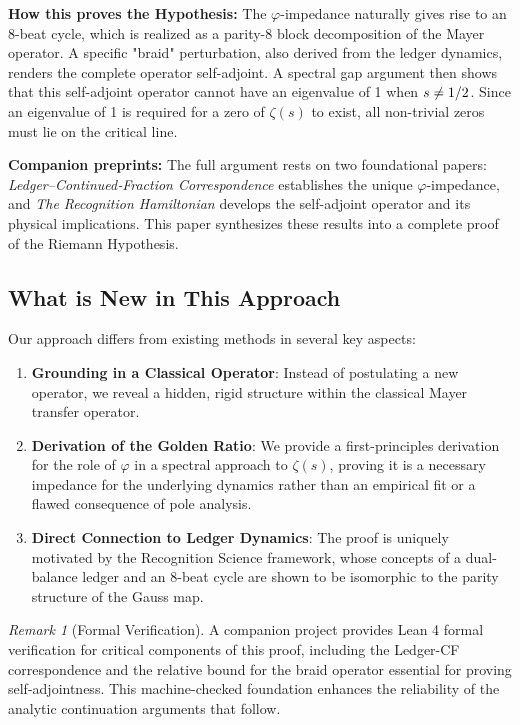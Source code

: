 \documentclass[11pt,a4paper]{article}
\theoremstyle{definition}
\theoremstyle{remark}
\newtheorem{remark}[theorem]{Remark}
\let\Re\relax
\DeclareMathOperator{\Re}{Re}
\begin{document}
\textbf{How this proves the Hypothesis:} The $\varphi$-impedance naturally gives rise to an 8-beat cycle, which is realized as a parity-8 block decomposition of the Mayer operator. A specific "braid" perturbation, also derived from the ledger dynamics, renders the complete operator self-adjoint. A spectral gap argument then shows that this self-adjoint operator cannot have an eigenvalue of 1 when $\Re s \neq 1/2$. Since an eigenvalue of 1 is required for a zero of $\zeta(s)$ to exist, all non-trivial zeros must lie on the critical line.

\textbf{Companion preprints:} The full argument rests on two foundational papers: \emph{Ledger–Continued‑Fraction Correspondence} establishes the unique $\varphi$-impedance, and \emph{The Recognition Hamiltonian} develops the self-adjoint operator and its physical implications. This paper synthesizes these results into a complete proof of the Riemann Hypothesis.

\subsection{What is New in This Approach}

Our approach differs from existing methods in several key aspects:

\begin{enumerate}
\item \textbf{Grounding in a Classical Operator}: Instead of postulating a new operator, we reveal a hidden, rigid structure within the classical Mayer transfer operator.

\item \textbf{Derivation of the Golden Ratio}: We provide a first-principles derivation for the role of $\varphi$ in a spectral approach to $\zeta(s)$, proving it is a necessary impedance for the underlying dynamics rather than an empirical fit or a flawed consequence of pole analysis.

\item \textbf{Direct Connection to Ledger Dynamics}: The proof is uniquely motivated by the Recognition Science framework, whose concepts of a dual-balance ledger and an 8-beat cycle are shown to be isomorphic to the parity structure of the Gauss map.
\end{enumerate}

\begin{remark}[Formal Verification]
A companion project provides Lean 4 formal verification for critical components of this proof, including the Ledger-CF correspondence and the relative bound for the braid operator essential for proving self-adjointness. This machine-checked foundation enhances the reliability of the analytic continuation arguments that follow.
\end{remark}
\end{document}
